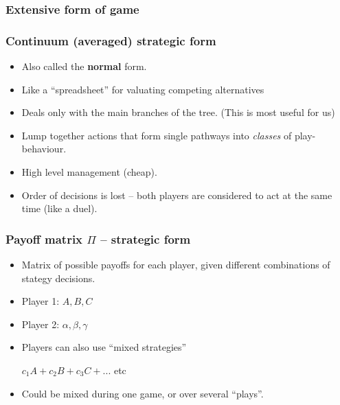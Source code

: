 \documentclass{beamer}
\begin{document}
\begin{frame}
\frametitle{Extensive form of game}
\end{frame}


\begin{frame}
\frametitle{Continuum (averaged) strategic form}

\begin{itemize}
\item Also called the {\bf normal} form.\vspace{0.2cm}

\item Like a ``spreadsheet'' for valuating competing alternatives\vspace{0.2cm}

\item Deals only with the main branches of the tree.
(This is most useful for us)\vspace{0.2cm}

\item Lump together actions that form single pathways into {\em classes} of play-behaviour.\vspace{0.2cm}

\item High level management (cheap).\vspace{0.2cm}

\item Order of decisions is lost -- both players are considered to act at the same
time (like a duel).
\end{itemize}
\end{frame}


\begin{frame}\frametitle{Payoff matrix $\Pi$ -- strategic form}

\begin{itemize}
\item Matrix of possible payoffs for each player, given different combinations of 
stategy decisions.
\end{itemize}



\begin{itemize}
\item Player 1: $A,B,C$
\item Player 2: $\alpha,\beta,\gamma$

\item Players can also use ``mixed strategies''

 $c_1A+c_2B+c_3C+...$ etc

\item Could be mixed during one game, or over several ``plays''.
\end{itemize}
\end{frame}
\end{document}
